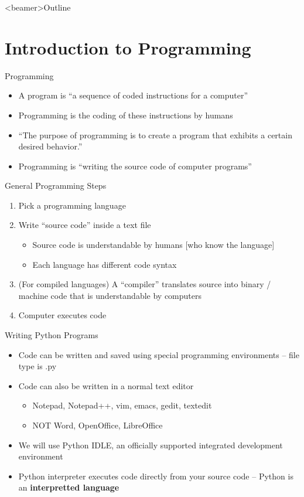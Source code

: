 \begin{frame}<beamer>{Outline}
%  
\tableofcontents
\end{frame}
\section{Introduction to Programming}

\begin{frame}{Programming}
\begin{itemize}
\item A program is ``a sequence of coded instructions for a computer''
\item Programming is the coding of these instructions by humans
\item ``The purpose of programming is to create a program that exhibits a certain desired behavior.''
\item Programming is ``writing the source code of computer programs''
\end{itemize}
\end{frame}

\begin{frame}{General Programming Steps}
\begin{enumerate}
\item Pick a programming language
\item Write ``source code'' inside a text file
\begin{itemize}
\item Source code is understandable by humans [who know the language]
\item Each language has different code syntax
\end{itemize}
\item (For compiled languages) A ``compiler'' translates source into binary / machine code that is understandable by computers
\item Computer executes code
\end{enumerate}
\end{frame}

\begin{frame}{Writing Python Programs}
\begin{itemize}
\item Code can be written and saved using special programming environments -- file type is .py
\item Code can also be written in a normal text editor
\begin{itemize}
\item Notepad, Notepad++, vim, emacs, gedit, textedit
\item NOT Word, OpenOffice, LibreOffice
\end{itemize}
\item We will use Python IDLE, an officially supported integrated development environment
\item Python interpreter executes code directly from your source code -- Python is an \textbf{interpretted language}
\end{itemize}
\end{frame}

